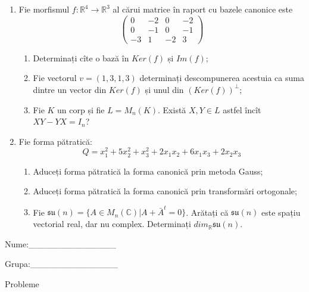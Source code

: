 \documentclass{article}
\begin{document}
\begin{enumerate}
 \item Fie morfismul $f:\mathbb{R}^4 \to \mathbb{R}^3$ al cărui matrice în raport cu bazele canonice este
$$\begin{pmatrix}
0&-2&0&-2\\
0&-1&0&-1\\
-3&1&-2&3
\end{pmatrix}$$

\begin{enumerate}
\item Determinați cîte o bază în $Ker(f)$ și $Im(f)$;
\item Fie vectorul $v=(1,3,1,3)$ determinați descompunerea acestuia ca suma dintre un vector din $Ker(f)$ și unul din $(Ker(f))^\perp$;
\item Fie $K$ un corp și fie $L=M_n(K)$. Există $X,Y \in L$ astfel încît $XY-YX=I_n$?  
\end{enumerate}
\item Fie forma pătratică:
$$Q= x_1^2+5x_2^2+x_3^2+2x_1x_2+6x_1x_3+2x_2x_3$$

\begin{enumerate}
\item Aduceți forma pătratică la forma canonică prin metoda Gauss;
\item Aduceți forma pătratică la forma canonică prin transformări ortogonale;
\item Fie $\mathfrak{su}(n)=\{ A \in M_n(\mathbb{C}) | A+\bar{A}^t=0\}$. Arătați că $\mathfrak{su}(n)$ este spațiu vectorial real, dar nu complex.
Determinați $dim_{\mathbb{R}}\mathfrak{su}(n)$.
\end{enumerate}
\end{enumerate}
\newpage
\begin{flushright}
Nume:\_\_\_\_\_\_\_\_\_\_\_\_\_\_
 
 
Grupa:\_\_\_\_\_\_\_\_\_\_\_\_\_\_
\end{flushright}
\begin{center}
\vspace{2cm}
{\Large Probleme}
\vspace{2cm}
\end{center}
\end{document}
